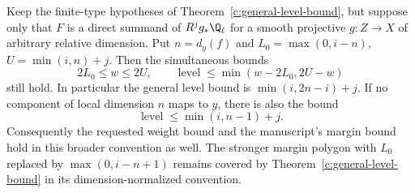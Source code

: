 \begin{proposition}
\label{c:broader-coefficients}
Keep the finite-type hypotheses of Theorem~\ref{c:general-level-bound}, but suppose only that $F$ is a direct summand of $R^jg_*\Q_\ell$ for a smooth projective $g:Z\to X$ of arbitrary relative dimension. Put $n=d_y(f)$ and $L_0=\max(0,i-n)$, $U=\min(i,n)+j$. Then the simultaneous bounds
\[
 2L_0\leq w\leq2U,\qquad
 \operatorname{level}\leq\min(w-2L_0,2U-w)
\]
still hold. In particular the general level bound is $\min(i,2n-i)+j$.
If no component of local dimension $n$ maps to $y$, there is also the bound
\[
 \operatorname{level}\leq\min(i,n-1)+j.
\]
Consequently the requested weight bound and the manuscript's margin bound hold in this broader convention as well. The stronger margin polygon with $L_0$ replaced by $\max(0,i-n+1)$ remains covered by Theorem~\ref{c:general-level-bound} in its dimension-normalized convention.
\end{proposition}

